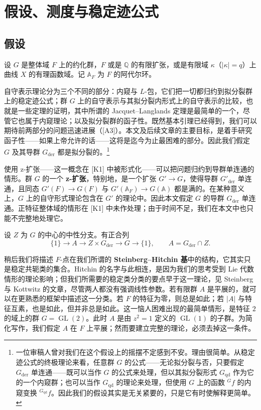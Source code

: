 \section{假设、测度与稳定迹公式}
\subsection{假设}

设 $G$ 是整体域 $F$ 上的约化群，$F$ 或是 $\mathbb Q$ 的有限扩张，或是有限域 $\kappa$（$|\kappa|=q$）上曲线 $X$ 的有理函数域。记 $\mathbb A_F$ 为 $F$ 的阿代尔环。

自守表示理论分为三个不同的部分：内窥与 $L$-包，它们把一切都归约到拟分裂群上的稳定迹公式；群 $G$ 上的自守表示与其拟分裂内形式上的自守表示的比较，也就是一些定理的证明，其中所谓的 Jacquet–Langlands 定理是最简单的一个，尽管它也属于内窥理论；以及拟分裂群的函子性。既然基本引理已经得到，我们可以期待前两部分的问题迅速进展（[A3]）。本文及后续文章的主要目标，是着手研究函子性——如果上帝允许的话——这将是迄今为止最困难的部分。因此我们假定 $G$ 及其导群 $G_{\mathrm{der}}$ 都是拟分裂的。\footnote{一位审稿人曾对我们在这个假设上的摇摆不定感到不安。理由很简单。从稳定迹公式的终极理论来看，任意群 $G$ 的公式——无论拟分裂与否，只要假定 $G_{\mathrm{der}}$ 单连通——既可以当作 $G$ 的公式来处理，但以其拟分裂形式 $G_{\mathrm{qd}}$ 作为它的一个内窥群；也可以当作 $G_{\mathrm{qd}}$ 的理论来处理，但使用 $G$ 上的函数 ${}^Gf$ 的内窥变换 ${}^{G_{\mathrm{qd}}}f$。因此我们的假设其实是无关紧要的，只是它有时使解释更简单。}

使用 z-扩张——这一概念在 [K1] 中被形式化——可以把问题归约到导群单连通的情形。群 $G$ 的一个 \textbf{z-扩张}，特别地，是一个扩张 $G'\to G$，使得导群 $G'_{\mathrm{der}}$ 单连通，且同态 $G'(F)\to G(F)$ 与 $G'(\mathbb A_F)\to G(\mathbb A)$ 都是满的。在某种意义上，$G$ 上的自守形式理论包含在 $G'$ 的理论中。因此本文假定 $G$ 的导群 $G_{\mathrm{der}}$ 单连通。正特征整体域的情形在 [K1] 中未作处理；由于时间不足，我们在本文中也只能不完整地处理它。

设 $Z$ 为 $G$ 的中心的中性分支。有正合列
\begin{equation}\tag{3.1}
\{1\}\to A\to Z\times G_{\mathrm{der}}\to G\to\{1\},
\qquad A=G_{\mathrm{der}}\cap Z.
\end{equation}

稍后我们将描述 $F$-点在我们所谓的 \textbf{Steinberg–Hitchin 基}中的结构，它其实只是稳定共轭类的集合。Hitchin 的名字与此相连，是因为我们的思考受到 Lie 代数情形的理论影响；但我们所需要的稳定类分类的要点早于这一理论，见 Steinberg 与 Kottwitz 的文章，尽管两人都没有强调线性参数。若有限群 $A$ 是平展的，就可以在更熟悉的框架中描述这一分类。若 $F$ 的特征为零，则总是如此；若 $|A|$ 与特征互素，也是如此，但并非总是如此。这一恼人困难出现的最简单情形，是特征 $2$ 的域上的群 $G=\operatorname{GL}(2)$。此时 $A$ 是由 $z^2=1$ 定义的 $\operatorname{GL}(1)$ 的子群。为简化写作，我们假定 $A$ 在 $F$ 上平展；然而要建立完整的理论，必须去掉这一条件。

